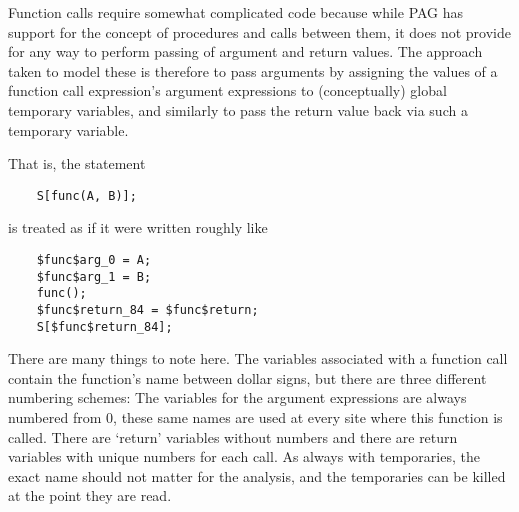 \documentclass[12pt]{article}
\begin{document}
Function calls require somewhat complicated code because while PAG
has support for the concept of procedures and calls between them, it
does not provide for any way to perform passing of argument and
return values. The approach taken to model these is therefore to
pass arguments by assigning the values of a function call
expression's argument expressions to (conceptually) global temporary
variables, and similarly to pass the return value back via such a
temporary variable.

That is, the statement
\begin{lstlisting}
    S[func(A, B)];
\end{lstlisting}
is treated as if it were written roughly like
\begin{lstlisting}
    $func$arg_0 = A;
    $func$arg_1 = B;
    func();
    $func$return_84 = $func$return;
    S[$func$return_84];
\end{lstlisting}
There are many things to note here. The variables associated
with a function call contain the function's name between dollar
signs, but there are three different numbering schemes: The
variables for the argument expressions are always numbered from 0,
these same names are used at every site where this function is
called. There are `return' variables without numbers and there are
return variables with unique numbers for each call. As always with
temporaries, the exact name should not matter for the analysis, and
the temporaries can be killed at the point they are read.

\end{document}
